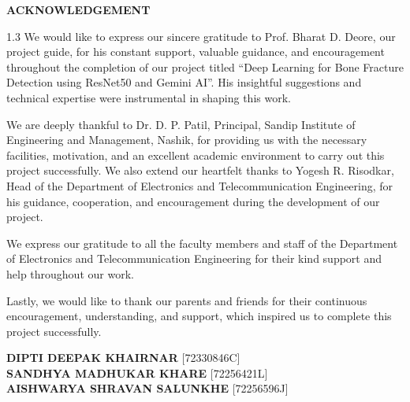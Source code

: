 \documentclass[a4paper,12pt]{report}
\begin{document}
    \begin{titlepage}
    \begin{center}
    \vspace*{1cm}
    \textbf{\LARGE ACKNOWLEDGEMENT}\\[1.5em]
    \end{center}

    \begin{spacing}{1.3}
    \justifying
    \noindent
    We would like to express our sincere gratitude to Prof. Bharat D. Deore, our project guide,
    for his constant support, valuable guidance, and encouragement throughout the completion of
    our project titled “Deep Learning for Bone Fracture Detection using ResNet50 and Gemini AI”. His insightful suggestions
    and technical expertise were instrumental in shaping this work.

    \vspace{1em}
    \noindent
    We are deeply thankful to Dr. D. P. Patil, Principal, Sandip Institute of Engineering and Management,
    Nashik, for providing us with the necessary facilities, motivation, and an excellent
    academic environment to carry out this project successfully.
    \vspace{1em}
    \noindent
    We also extend our heartfelt thanks to Yogesh R. Risodkar, Head of the Department of Electronics
    and Telecommunication Engineering, for his guidance, cooperation, and encouragement
    during the development of our project.

    \vspace{1em}
    \noindent
    We express our gratitude to all the faculty members and staff of the Department of Electronics
    and Telecommunication Engineering for their kind support and help throughout our work.

    \vspace{1em}
    \noindent
    Lastly, we would like to thank our parents and friends for their continuous encouragement,
    understanding, and support, which inspired us to complete this project successfully.
    \end{spacing}

    \vspace{3em}
    \begin{flushright}
    \textbf{DIPTI DEEPAK KHAIRNAR} \hspace{1em} [72330846C]\\
    \textbf{SANDHYA MADHUKAR KHARE} \hspace{1em} [72256421L]\\
    \textbf{AISHWARYA SHRAVAN SALUNKHE} \hspace{1em} [72256596J]
    \end{flushright}
    \end{titlepage}
\end{document}
